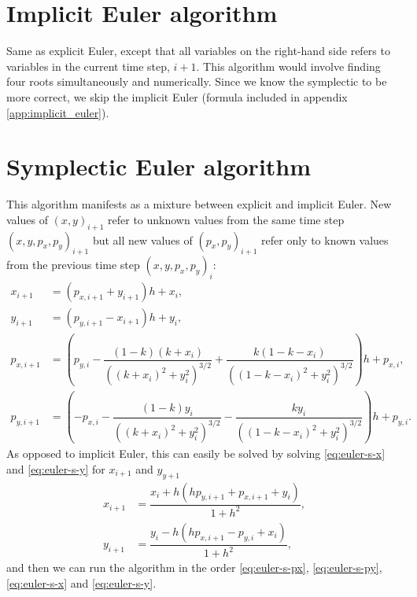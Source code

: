 \section{Implicit Euler algorithm}
Same as explicit Euler, except that all variables on the right-hand side refers to variables in the current time step, $i+1$. This algorithm would involve finding four roots simultaneously and numerically. Since we know the symplectic to be more correct, we skip the implicit Euler (formula included in appendix \ref{app:implicit_euler}).

\section{Symplectic Euler algorithm}
This algorithm manifests as a mixture between explicit and implicit Euler. New values of $(x,y)_{i+1}$ refer to unknown values from the same time step $(x,y,p_x,p_y)_{i+1}$ but all new values of $(p_x,p_y)_{i+1}$ refer only to known values from the previous time step $(x,y,p_x,p_y)_i$:
\begin{align}
x_{i+1} &= (p_{x,i+1} + y_{i+1})h + x_i \label{eq:euler-s-x}, \\[0.2cm]
y_{i+1} &= (p_{y,i+1} - x_{i+1})h + y_i \label{eq:euler-s-y}, \\[0.2cm]
p_{x,i+1} &= \left(p_{y,i} - \dfrac{(1-k)(k+x_i)}{((k+x_i)^2+y_i^2)^{3/2}} + \dfrac{k(1-k-x_i)}{((1-k-x_i)^2+y_i^2)^{3/2}}\right)h + p_{x,i} \label{eq:euler-s-px}, \\[0.2cm]
p_{y,i+1} &= \left(-p_{x,i} - \dfrac{(1-k)y_i}{((k+x_i)^2+y_i^2)^{3/2}} - \dfrac{k y_i}{((1-k-x_i)^2+y_i^2)^{3/2}}\right)h + p_{y,i}. \label{eq:euler-s-py}
\end{align}
As opposed to implicit Euler, this can easily be solved by solving \eqref{eq:euler-s-x} and \eqref{eq:euler-s-y} for $x_{i+1}$ and $y_{y+1}$
\begin{align}
x_{i+1} &= \dfrac{x_i + h(h p_{y,i+1} + p_{x,i+1} + y_i)}{1+h^2}, \label{eq:euler_s_x2} \\[0.5cm]
y_{i+1} &= \dfrac{y_i - h(h p_{x,i+1} - p_{y,i} + x_i)}{1+h^2}, \label{eq:euler_s_y2}
\end{align}
and then we can run the algorithm in the order \eqref{eq:euler-s-px}, \eqref{eq:euler-s-py}, \eqref{eq:euler-s-x} and \eqref{eq:euler-s-y}.

